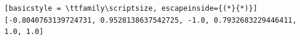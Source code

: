 \begin{lstlisting}[basicstyle = \ttfamily\scriptsize, escapeinside={(*}{*)}]
[-0.8040763139724731, 0.9528138637542725, -1.0, 0.7932683229446411, 1.0, 1.0]
\end{lstlisting}
